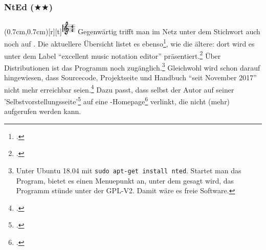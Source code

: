 %
%
%



\subsubsection{NtEd ($\bigstar$$\bigstar$)}


\parpic(0.7cm,0.7cm)[r][t]{\includegraphics[width=0.7cm]{logos/nted-300dpi.png}}
\label{NtEd}Gegenwärtig trifft man im Netz unter dem Stichwort
 auch noch auf . Die aktuellere Übersicht
listet es ebenso\footcite[vgl.][\nopage wp]{WpedNotensatz2019a}, wie die ältere:
dort wird es unter dem Label \enquote{excellent music notation editor}
präsentiert.\footcite[vgl.][\nopage wp]{LinuxSoundNotation2006a} Über
Distributionen ist das Programm noch zugänglich.\footnote{Unter Ubuntu 18.04 mit
\texttt{sudo apt-get install nted}. Startet man das Program, bietet es einen
Menuepunkt  an, unter dem gesagt wird, das Programm stünde unter der
GPL-V2. Damit wäre es freie Software.} Gleichwohl wird schon darauf
hingewiesen, dass Sourcecode, Projektseite und Handbuch \enquote{seit November
2017} nicht mehr erreichbar seien.\footcite[vgl.][\nopage wp]{UbuntuNtEd2016a}
Dazu passt, dass selbst der Autor  auf seiner
'Selbstvorstellungsseite'\footcite[vgl.][\nopage wp]{Andres2018a} auf eine
-Homepage\footcite[vgl.][\nopage wp]{Andres2018b} verlinkt, die nicht
(mehr) aufgerufen werden kann.
 
